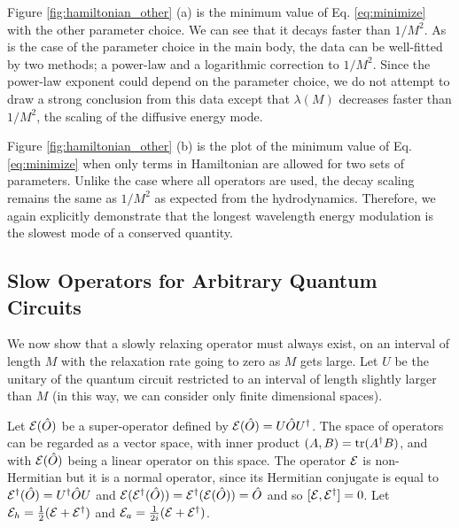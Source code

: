 \documentclass[twocolumn,superscriptaddress, prb]{revtex4-1}
\begin{document}
Figure \ref{fig:hamiltonian_other} (a) is the minimum value of Eq. \eqref{eq:minimize} with the other parameter choice.
We can see that it decays faster than $1/M^2$. As is the case of the parameter choice in the main body,
the data can be well-fitted by two methods; a power-law and a logarithmic correction to $1/M^2$.
Since the power-law exponent could depend on the parameter choice, we do not attempt to draw a strong conclusion from this data
except that $\lambda(M)$ decreases faster than $1/M^2$,
the scaling of the diffusive energy mode.

Figure \ref{fig:hamiltonian_other} (b) is the plot of the minimum value of Eq. \eqref{eq:minimize} when only terms in Hamiltonian are allowed
for two sets of parameters. Unlike the case where all operators are used,
the decay scaling remains the same as $1/M^2$ as expected from the hydrodynamics.
Therefore, we again explicitly demonstrate that the longest wavelength energy modulation is the slowest mode of a conserved quantity.


\subsection{Slow Operators for Arbitrary Quantum Circuits}
We now show that a slowly relaxing operator must always exist, on an interval of length $M$ with the relaxation rate going to zero as $M$ gets large.  Let $U$ be the unitary of the quantum circuit restricted to an interval of length slightly larger than $M$ (in this way, we can consider only finite dimensional spaces).

Let ${\cal E}(\hat{O})$ be a super-operator defined by ${\cal E}(\hat{O})=U\hat{O}U^\dagger$.  The space of operators can be regarded as a vector space, with inner product $(A,B)={\rm tr}(A^\dagger B)$, and with ${\cal E}(\hat{O})$ being a linear operator on this space.  The operator ${\cal E}$ is non-Hermitian but it is a normal operator, since its Hermitian conjugate is equal to ${\cal E}^\dagger(\hat{O})=U^\dagger \hat{O} U$ and ${\cal E}({\cal E}^\dagger(\hat{O}))={\cal E}^\dagger({\cal E}(\hat{O}))=\hat{O}$ and so $[{\cal E},{\cal E}^\dagger]=0$.
Let ${\cal E}_h=\frac{1}{2}({\cal E}+{\cal E}^\dagger)$ and ${\cal E}_a=\frac{1}{2i}({\cal E}+{\cal E}^\dagger)$.
\end{document}
